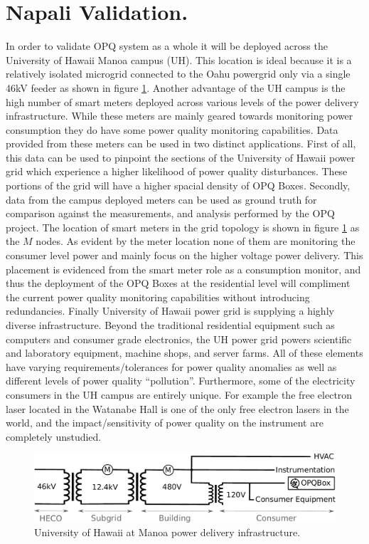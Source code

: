 \section{Napali Validation.}
In order to validate OPQ system as a whole it will be deployed across the University of Hawaii Manoa campus (UH). This location is ideal because it is a relatively isolated microgrid connected to the Oahu powergrid only via a single 46kV feeder as shown in figure \ref{expdes:fig:1}. Another advantage of the UH campus is the high number of smart meters deployed across various levels of the power delivery infrastructure. While these meters are mainly geared towards monitoring power consumption they do have some power quality monitoring capabilities. Data provided from these meters can be used in two distinct applications. First of all, this data can be used to pinpoint the sections of the University of Hawaii power grid which experience a higher likelihood of power quality disturbances. These portions of the grid will have a higher spacial density of OPQ Boxes. Secondly, data from the campus deployed meters can be used as ground truth for comparison against the measurements, and analysis performed by the OPQ project. The location of smart meters in the grid topology is shown in figure \ref{expdes:fig:1} as the $M$ nodes. As evident by the meter location none of them are monitoring the consumer level power and mainly focus on the higher voltage power delivery. This placement is evidenced from the smart meter role as a consumption monitor, and thus the deployment of the OPQ Boxes at the residential level will compliment the current power quality monitoring capabilities without introducing redundancies. Finally University of Hawaii power grid is supplying a highly diverse infrastructure. Beyond the traditional residential equipment such as computers and consumer grade electronics, the UH power grid powers scientific and laboratory equipment, machine shops, and server farms. All of these elements have varying requirements/tolerances for power quality anomalies as well as different levels of power quality ``pollution''. Furthermore, some of the electricity consumers in the UH campus are entirely unique. For example the free electron laser located in the Watanabe Hall is one of the only free electron lasers in the world, and the impact/sensitivity of power quality on the instrument are completely unstudied.
\begin{figure}[h]
	\centering
	\includegraphics[width=1\linewidth]{img/uh-grid.pdf}	
	\caption{University of Hawaii at Manoa power delivery infrastructure.}
	\label{expdes:fig:1}
\end{figure}

